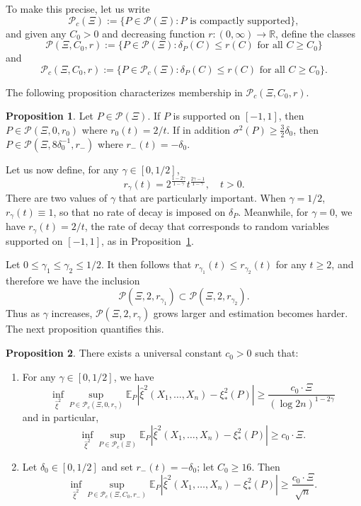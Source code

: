 \documentclass{article}
\theoremstyle{definition}
\newtheorem{proposition}{Proposition}
\newcommand{\R}{\mathbb{R}}
\newcommand{\E}{\mathbb{E}}
\newcommand{\1}{\mathbbm{1}}
\begin{document}
To make this precise, let us write
\[
\mathcal P_c(\Xi) := \{P \in \mathcal P(\Xi): \text{$P$ is compactly supported}\},
\]
and given any $C_0 > 0$ and decreasing function $r: (0, \infty) \to \R$, define the classes
\[
\mathcal P(\Xi, C_0, r) := \{P \in \mathcal P(\Xi): \delta_P(C) \leq r(C) \text{ for all $C \geq C_0$}\}
\]
and 
\[
\mathcal P_c(\Xi, C_0, r) := \{P \in \mathcal P_c(\Xi): \delta_P(C) \leq r(C) \text{ for all $C \geq C_0$}\}.
\]

The following proposition characterizes membership in $\mathcal P_c(\Xi, C_0, r)$.
\begin{proposition}
\label{prop:unif-supp-delta-inclusion}
    Let $P \in \mathcal P(\Xi)$. If $P$ is supported on $[-1, 1]$, then $P \in \mathcal P(\Xi, 0, r_0)$ where $r_{0}(t) = 2/t$. If in addition $\sigma^2(P) \geq \frac32\delta_0$, then $P \in \mathcal P(\Xi, 8\delta_0^{-1}, r_-)$ where $r_-(t) = - \delta_0$.
\end{proposition}
Let us now define, for any $\gamma \in [0, 1/2]$, 
\[
 r_\gamma(t) = 2^{\frac{1 - 2\gamma}{1 - \gamma}} t^{\frac{2\gamma - 1}{1 - \gamma}}, \quad t > 0.
\]
There are two values of $\gamma$ that are particularly important. When $\gamma = 1/2$, $r_\gamma(t) \equiv 1$, so that no rate of decay is imposed on $\delta_P$. Meanwhile, for $\gamma = 0$, we have $r_\gamma(t) = 2/t$, the rate of decay that corresponds to random variables supported on $[-1, 1]$, as in Proposition~\ref{prop:unif-supp-delta-inclusion}.

Let $0 \leq \gamma_1 \leq \gamma_2 \leq 1/2$. It then follows that $r_{\gamma_1}(t) \leq r_{\gamma_2}(t)$ for any $t \geq 2$, and therefore we have the inclusion 
\[
\mathcal P(\Xi, 2, r_{\gamma_1}) \subset \mathcal P(\Xi, 2, r_{\gamma_2}).
\]
Thus as $\gamma$ increases, $\mathcal P(\Xi, 2, r_\gamma)$ grows larger and estimation becomes harder. The next proposition quantifies this.



\begin{proposition}
\label{prop:minimax-rates}
There exists a universal constant $c_0> 0$ such that: 
    \begin{enumerate}
        \item[(a)] For any $\gamma \in [0, 1/2]$, we have 
        \[
        \inf_{\hat \xi^2} \sup_{P \in \mathcal P_c(\Xi, 0, r_\gamma)} \E_P|\hat \xi^2(X_1, \dots, X_n) - \xi_*^2(P)| \geq \frac{c_0 \cdot \Xi }{(\log 2n)^{1 - 2\gamma}}
        \]
        and in particular, 
        \[
        \inf_{\hat \xi^2} \sup_{P \in \mathcal P_c(\Xi)} \E_P|\hat \xi^2(X_1, \dots, X_n) - \xi_*^2(P)| \geq c_0 \cdot \Xi.
        \]
        \item[(b)] Let $\delta_0 \in [0, 1/2]$ and set $r_{-}(t) = -\delta_0$; let $C_0 \geq 16$. Then 
        \[
        \inf_{\hat \xi^2} \sup_{P \in \mathcal P_c(\Xi,C_0, r_-)} \E_P|\hat \xi^2(X_1, \dots, X_n) - \xi_*^2(P)| \geq \frac{c_0 \cdot \Xi}{\sqrt n}.
        \]
    \end{enumerate}
\end{proposition}
\end{document}
